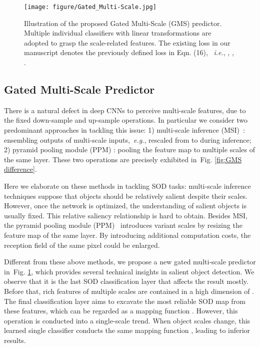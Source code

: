 \documentclass[journal]{IEEEtran}
\def\ie{{\em i.e.}}
\def\eg{{\em e.g.}}
\newcommand{\figref}[1]{Fig. \ref{#1}}
\begin{document}
\begin{figure}[t]
\begin{center}
\texttt{[image: figure/Gated\_Multi-Scale.jpg]}
	\caption{Illustration of the proposed Gated Multi-Scale (GMS) predictor. Multiple individual classifiers with  linear transformations are adopted to grasp the scale-related features.  The existing loss in our manuscript denotes the previously defined loss in Eqn. (16), ~\ie, , , .}\label{fig:GMS}
	\end{center}
\end{figure}


\subsection{Gated Multi-Scale Predictor}\label{sec:gms}
There is a natural defect in deep CNNs to perceive multi-scale features, due to the fixed down-sample and up-sample operations. In particular we consider two predominant approaches in tackling this issue: 1) multi-scale inference (MSI)~\cite{chen2016attention}: ensembling outputs of multi-scale inputs,~\eg, rescaled from  to  during inference; 2) pyramid pooling module (PPM) \cite{zhao2017pyramid,zhao2019pyramid}: pooling the feature map to multiple scales of the same layer. These two operations are precisely exhibited in~\figref{fig:GMS difference}.


Here we elaborate on these methods in tackling SOD tasks:
multi-scale inference techniques suppose that objects should be relatively salient despite their scales. However, once the network is optimized, the understanding of salient objects is usually fixed. This relative saliency relationship is hard to obtain. Besides MSI, the pyramid pooling module (PPM)~\cite{zhao2017pyramid} introduces variant scales by resizing the feature map of the same layer. By introducing additional computation costs, the reception field of the same pixel could be enlarged.


Different from these above methods, we propose a new gated multi-scale predictor in~\figref{fig:GMS}, which provides several technical insights in salient object detection. We observe that it is the last SOD classification layer that affects the result mostly. Before that, rich features of multiple scales are contained in a high dimension of . The final classification layer aims to excavate the most reliable SOD map  from these features, which can be regarded as a mapping function . However, this operation is conducted into a single-scale trend. When object scales change, this learned single classifier conducts the same mapping function , leading to inferior results.
\end{document}
